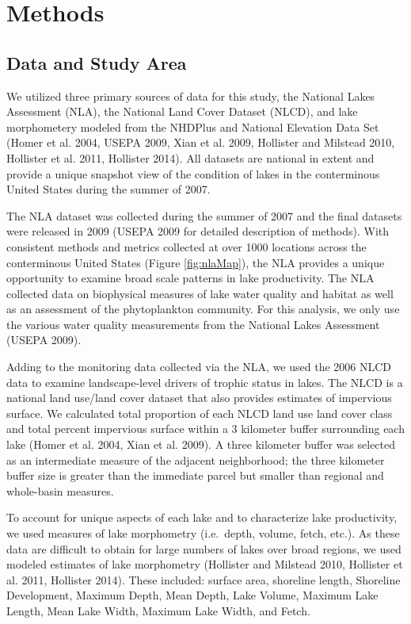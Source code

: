 \documentclass[11pt,]{article}
\begin{document}
\section{Methods}\label{methods}

\subsection{Data and Study Area}\label{data-and-study-area}

We utilized three primary sources of data for this study, the National
Lakes Assessment (NLA), the National Land Cover Dataset (NLCD), and lake
morphometery modeled from the NHDPlus and National Elevation Data Set
(Homer et al. 2004, USEPA 2009, Xian et al. 2009, Hollister and Milstead
2010, Hollister et al. 2011, Hollister 2014). All datasets are national
in extent and provide a unique snapshot view of the condition of lakes
in the conterminous United States during the summer of 2007.

The NLA dataset was collected during the summer of 2007 and the final
datasets were released in 2009 (USEPA 2009 for detailed description of
methods). With consistent methods and metrics collected at over 1000
locations across the conterminous United States (Figure
\ref{fig:nlaMap}), the NLA provides a unique opportunity to examine
broad scale patterns in lake productivity. The NLA collected data on
biophysical measures of lake water quality and habitat as well as an
assessment of the phytoplankton community. For this analysis, we only
use the various water quality measurements from the National Lakes
Assessment (USEPA 2009).

Adding to the monitoring data collected via the NLA, we used the 2006
NLCD data to examine landscape-level drivers of trophic status in lakes.
The NLCD is a national land use/land cover dataset that also provides
estimates of impervious surface. We calculated total proportion of each
NLCD land use land cover class and total percent impervious surface
within a 3 kilometer buffer surrounding each lake (Homer et al. 2004,
Xian et al. 2009). A three kilometer buffer was selected as an
intermediate measure of the adjacent neighborhood; the three kilometer
buffer size is greater than the immediate parcel but smaller than
regional and whole-basin measures.

To account for unique aspects of each lake and to characterize lake
productivity, we used measures of lake morphometry (i.e.~depth, volume,
fetch, etc.). As these data are difficult to obtain for large numbers of
lakes over broad regions, we used modeled estimates of lake morphometry
(Hollister and Milstead 2010, Hollister et al. 2011, Hollister 2014).
These included: surface area, shoreline length, Shoreline Development,
Maximum Depth, Mean Depth, Lake Volume, Maximum Lake Length, Mean Lake
Width, Maximum Lake Width, and Fetch.
\end{document}
